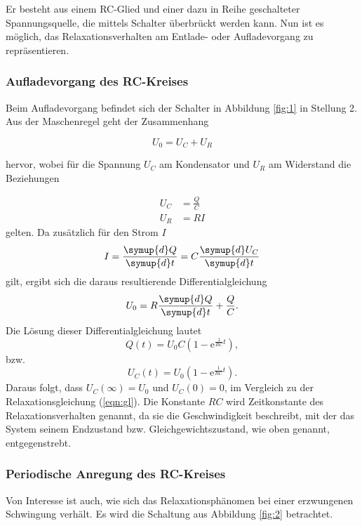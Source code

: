 Er besteht aus einem RC-Glied und einer dazu in Reihe geschalteter Spannungsquelle, die mittels Schalter überbrückt werden kann.
Nun ist es möglich, das Relaxationsverhalten am Entlade- oder Aufladevorgang zu repräsentieren.
\subsubsection{Aufladevorgang des RC-Kreises}
Beim Aufladevorgang befindet sich der Schalter in Abbildung \ref{fig:1} in Stellung 2.
Aus der Maschenregel geht der Zusammenhang

\begin{equation}
  U_0 = U_C + U_R \label{eqn:1}
\end{equation}

hervor, wobei für die Spannung $U_C$ am Kondensator und $U_R$ am Widerstand die Beziehungen

\begin{align*}
  U_C &= \frac{Q}{C}\\
  U_R &= RI
\end{align*}
gelten.
Da zusätzlich für den Strom $I$
\begin{equation}
  I = \frac{\symup{d} Q}{\symup{d} t} = C\frac{\symup{d} U_C}{\symup{d} t} \label{eqn:2}
\end{equation}
gilt, ergibt sich die daraus resultierende Differentialgleichung
\begin{equation}
  U_0 = R\frac{\symup{d} Q}{\symup{d} t} + \frac{Q}{C}.
\end{equation}
Die Lösung dieser Differentialgleichung lautet
\begin{equation}
  Q(t) = U_0C(1-\mathrm{e}^{\frac{1}{RC}t}),
\end{equation}
bzw.
\begin{equation}
  U_C(t) = U_0(1-\mathrm{e}^{\frac{1}{RC}t}). \label{eqn:gl2}
\end{equation}
Daraus folgt, dass $U_C(\infty) = U_0$ und $U_C(0) = 0$, im Vergleich zu der Relaxationsgleichung (\ref{eqn:gl}).
Die Konstante $RC$ wird Zeitkonstante des Relaxationsverhalten genannt, da sie die Geschwindigkeit beschreibt, mit der das System seinem Endzustand bzw. Gleichgewichtszustand, wie oben genannt, entgegenstrebt.\\
\subsubsection{Periodische Anregung des RC-Kreises}
Von Interesse ist auch, wie sich das Relaxationsphänomen bei einer erzwungenen Schwingung verhält.
Es wird die Schaltung aus Abbildung \ref{fig:2} betrachtet.


